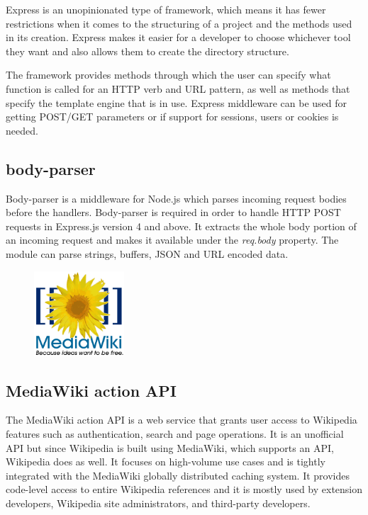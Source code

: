 \documentclass{report}
\begin{document}
Express is an unopinionated type of framework, which means it has fewer restrictions when it comes to the structuring of a project and the methods used in its creation. Express makes it easier for a developer to choose whichever tool they want and also allows them to create the directory structure.\par

The framework provides methods through which the user can specify what function is called for an HTTP verb and URL pattern, as well as methods that specify the template engine that is in use. Express middleware can be used for getting POST/GET parameters or if support for sessions, users or cookies is needed.

\subsection {body-parser}
Body-parser is a middleware for Node.js which parses incoming request bodies before the handlers. Body-parser is required in order to handle HTTP POST requests in Express.js version 4 and above. It extracts the whole body portion of an incoming request and makes it available under the \textit{req.body} property. The module can parse strings, buffers, JSON and URL encoded data. 

\begin{figure}
	\vspace*{-1cm}
    \centering
    \includegraphics[width=0.3\textwidth]{mediawiki}
	\vspace{-10pt} 
\end{figure}
\subsection {MediaWiki action API}
The MediaWiki action API is a web service that grants user access to Wikipedia features such as authentication, search and page operations. It is an unofficial API but since Wikipedia is built using MediaWiki, which supports an API, Wikipedia does as well. It focuses on high-volume use cases and is tightly integrated with the MediaWiki globally distributed caching system. It provides code-level access to entire Wikipedia references and it is mostly used by extension developers, Wikipedia site administrators, and third-party developers.
\end{document}
